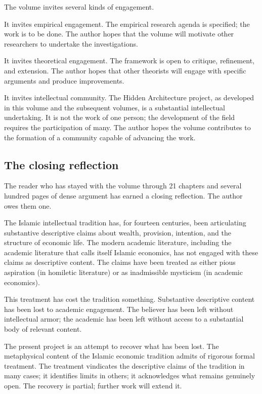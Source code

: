 The volume invites several kinds of engagement.

It invites empirical engagement. The empirical research agenda is
specified; the work is to be done. The author hopes that the
volume will motivate other researchers to undertake the
investigations.

It invites theoretical engagement. The framework is open to
critique, refinement, and extension. The author hopes that other
theorists will engage with specific arguments and produce
improvements.

It invites intellectual community. The Hidden Architecture
project, as developed in this volume and the subsequent volumes,
is a substantial intellectual undertaking. It is not the work of
one person; the development of the field requires the
participation of many. The author hopes the volume contributes to
the formation of a community capable of advancing the work.

\subsection{The closing reflection}

The reader who has stayed with the volume through 21 chapters and
several hundred pages of dense argument has earned a closing
reflection. The author owes them one.

The Islamic intellectual tradition has, for fourteen centuries,
been articulating substantive descriptive claims about wealth,
provision, intention, and the structure of economic life. The
modern academic literature, including the academic literature
that calls itself Islamic economics, has not engaged with these
claims as descriptive content. The claims have been treated as
either pious aspiration (in homiletic literature) or as
inadmissible mysticism (in academic economics).

This treatment has cost the tradition something. Substantive
descriptive content has been lost to academic engagement. The
believer has been left without intellectual armor; the academic
has been left without access to a substantial body of relevant
content.

The present project is an attempt to recover what has been lost.
The metaphysical content of the Islamic economic tradition admits
of rigorous formal treatment. The treatment vindicates the
descriptive claims of the tradition in many cases; it identifies
limits in others; it acknowledges what remains genuinely open.
The recovery is partial; further work will extend it.


